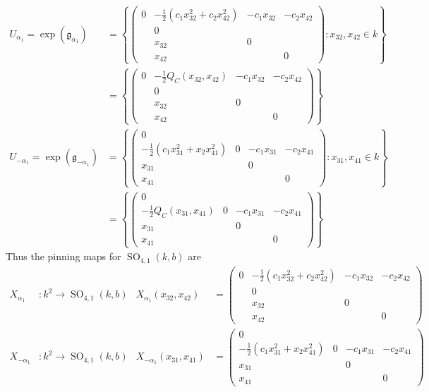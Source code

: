 \documentclass[12pt]{article}
\theoremstyle{definition}
\numberwithin{theorem}{subsection}
\newcommand{\lp}{\left(}
\newcommand{\rp}{\right)}
\newcommand{\lb}{\left\{}
\newcommand{\rb}{\right\}}
\newcommand{\frakg}{\mathfrak{g}}
\DeclareMathOperator{\SO}{SO}
\begin{document}
\begin{align*}
	U_{\alpha_1} = \exp(\frakg_{\alpha_1}) &=
	\lb
	\begin{pmatrix}
		0 & - \frac 12 \lp c_1 x_{32}^2 + c_2 x_{42}^2 \rp & - c_1 x_{32}  & - c_2 x_{42} \\
		& 0 &  \\
		& x_{32} & 0 &  \\
		& x_{42} && 0
	\end{pmatrix}  
	: x_{32}, x_{42} \in k
	\rb \\
	&=
	\lb
	\begin{pmatrix}
		0 & - \frac 12  Q_C \lp x_{32}, x_{42} \rp& - c_1 x_{32}  & - c_2 x_{42} \\
		& 0 &  \\
		& x_{32} & 0 &  \\
		& x_{42} && 0
	\end{pmatrix}  
	\rb \\
	U_{-\alpha_1} = \exp(\frakg_{-\alpha_1}) &= \lb
	\begin{pmatrix}
		0   \\
		- \frac 12 \lp c_1 x_{31}^2 + x_2 x_{41}^2 \rp & 0 & - c_1 x_{31} & - c_2 x_{41} \\
		x_{31} & & 0 & \\
		x_{41} & & & 0
	\end{pmatrix}
	: x_{31}, x_{41} \in k
	\rb \\
	&= \lb
	\begin{pmatrix}
		0   \\
		- \frac 12 Q_C \lp x_{31}, x_{41} \rp & 0 & - c_1 x_{31} & - c_2 x_{41} \\
		x_{31} & & 0 & \\
		x_{41} & & & 0
	\end{pmatrix}
	\rb
\end{align*}
Thus the pinning maps for $\SO_{4,1}(k,b)$ are
\begin{align*}
	X_{\alpha_1}& :k^2 \to \SO_{4,1}(k,b) & X_{\alpha_1}(x_{32}, x_{42}) &=
	\begin{pmatrix}
		0 & - \frac 12 \lp c_1 x_{32}^2 + c_2 x_{42}^2 \rp & - c_1 x_{32}  & - c_2 x_{42} \\
		& 0 &  \\
		& x_{32} & 0 &  \\
		& x_{42} && 0
	\end{pmatrix}  \\
	X_{-\alpha_1}&:k^2 \to \SO_{4,1}(k,b) & X_{-\alpha_1}(x_{31}, x_{41}) &=
	\begin{pmatrix}
		0   \\
		- \frac 12 \lp c_1 x_{31}^2 + x_2 x_{41}^2 \rp & 0 & - c_1 x_{31} & - c_2 x_{41} \\
		x_{31} & & 0 & \\
		x_{41} & & & 0
	\end{pmatrix}
\end{align*}
\end{document}
